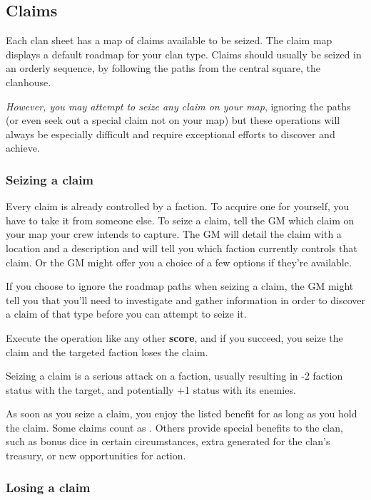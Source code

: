 \subsection{Claims}

Each clan sheet has a map of claims available to be seized. The claim map displays a default roadmap for your clan type. Claims should usually be seized in an orderly sequence, by following the paths from the central square, the clanhouse.

\textit{However, you may attempt to seize any claim on your map}, ignoring the paths (or even seek out a special claim not on your map) but these operations will always be especially difficult and require exceptional efforts to discover and achieve.

\subsubsection{Seizing a claim}

Every claim is already controlled by a faction. To acquire one for yourself, you have to take it from someone else. To seize a claim, tell the GM which claim on your map your crew intends to capture. The GM will detail the claim with a location and a description and will tell you which faction currently controls that claim. Or the GM might offer you a choice of a few options if they’re available.

If you choose to ignore the roadmap paths when seizing a claim, the GM might tell you that you’ll need to investigate and gather information in order to discover a claim of that type before you can attempt to seize it.

Execute the operation like any other \textbf{score}, and if you succeed, you seize the claim and the targeted faction loses the claim.

Seizing a claim is a serious attack on a faction, usually resulting in -2 faction status with the target, and potentially +1 status with its enemies.

As soon as you seize a claim, you enjoy the listed benefit for as long as you hold the claim. Some claims count as . Others provide special benefits to the clan, such as bonus dice in certain circumstances, extra  generated for the clan’s treasury, or new opportunities for action.

\subsubsection{Losing a claim}


